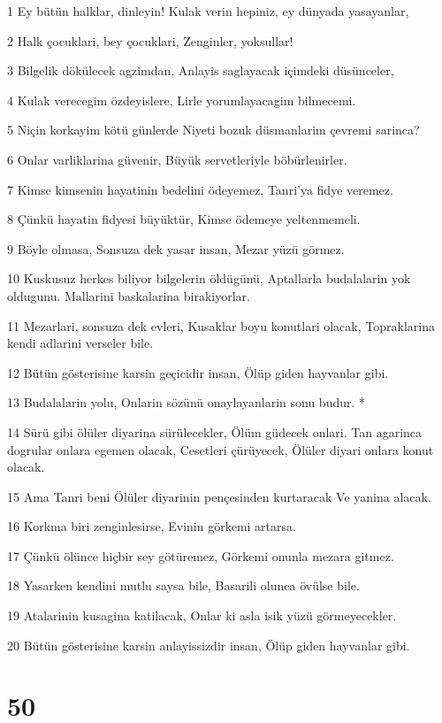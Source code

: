 \par 1 Ey bütün halklar, dinleyin! Kulak verin hepiniz, ey dünyada yasayanlar,
\par 2 Halk çocuklari, bey çocuklari, Zenginler, yoksullar!
\par 3 Bilgelik dökülecek agzimdan, Anlayis saglayacak içimdeki düsünceler,
\par 4 Kulak verecegim özdeyislere, Lirle yorumlayacagim bilmecemi.
\par 5 Niçin korkayim kötü günlerde Niyeti bozuk düsmanlarim çevremi sarinca?
\par 6 Onlar varliklarina güvenir, Büyük servetleriyle böbürlenirler.
\par 7 Kimse kimsenin hayatinin bedelini ödeyemez, Tanri'ya fidye veremez.
\par 8 Çünkü hayatin fidyesi büyüktür, Kimse ödemeye yeltenmemeli.
\par 9 Böyle olmasa, Sonsuza dek yasar insan, Mezar yüzü görmez.
\par 10 Kuskusuz herkes biliyor bilgelerin öldügünü, Aptallarla budalalarin yok oldugunu. Mallarini baskalarina birakiyorlar.
\par 11 Mezarlari, sonsuza dek evleri, Kusaklar boyu konutlari olacak, Topraklarina kendi adlarini verseler bile.
\par 12 Bütün gösterisine karsin geçicidir insan, Ölüp giden hayvanlar gibi.
\par 13 Budalalarin yolu, Onlarin sözünü onaylayanlarin sonu budur. *
\par 14 Sürü gibi ölüler diyarina sürülecekler, Ölüm güdecek onlari. Tan agarinca dogrular onlara egemen olacak, Cesetleri çürüyecek, Ölüler diyari onlara konut olacak.
\par 15 Ama Tanri beni Ölüler diyarinin pençesinden kurtaracak Ve yanina alacak.
\par 16 Korkma biri zenginlesirse, Evinin görkemi artarsa.
\par 17 Çünkü ölünce hiçbir sey götüremez, Görkemi onunla mezara gitmez.
\par 18 Yasarken kendini mutlu saysa bile, Basarili olunca övülse bile.
\par 19 Atalarinin kusagina katilacak, Onlar ki asla isik yüzü görmeyecekler.
\par 20 Bütün gösterisine karsin anlayissizdir insan, Ölüp giden hayvanlar gibi.

\chapter{50}

